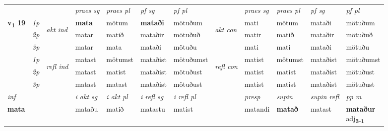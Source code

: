 \begin{longtable}[l]{X>{\footnotesize\itshape}llXXXXlXXXX}
\midrule

 & &   & \textit{praes sg}  & \textit{praes pl}    & \textit{ pf sg} & \textit{pf pl} & & \textit{praes sg}  & \textit{praes pl}    & \textit{pf sg} & \textit{pf pl }  \\ \cmidrule{4-7} \cmidrule{9-12}
 \multirow{2}{*}{{{\textbf{v{\textsubscript{1}}} \Large{\textbf{19}}}}}  & 1p & \multirow{3}{*}{\begin{turn}{90}\textit{akt ind}\end{turn}} & \textbf{mata} & mötum & \textbf{mataði} & mötuðum & \multirow{3}{*}{\begin{turn}{90}\textit{akt con}\end{turn}} &mati & mötum & mataði & mötuðum\\*
 & 2p &  &  matar  & matið & mataðir & mötuðuð & & matir & matið & mataðir & mötuðuð \\*
 & 3p &  & matar & mata & mataði & mötuðu & & mati & mati& mataði & mötuðu \\*
\cmidrule{4-7} \cmidrule{9-12}
 & 1p & \multirow{3}{*}{\begin{turn}{90}\textit{refl ind}\end{turn}}  & matast & mötumst & mataðist & mötuðumst & \multirow{3}{*}{\begin{turn}{90}\textit{refl con}\end{turn}}  &matist & mötumst & mataðist & mötuðumst \\*
 & 2p &  & matast & matist & mataðist & mötuðust & &matist & matist & mataðist & mötuðust \\*
 & 3p  & & matast & matast & mataðist & mötuðust & & matist & matist& mataðist & mötuðust \\*
\cmidrule{4-7} \cmidrule{9-12}

   {\textit{inf}} & &  & \textit{i akt sg} & \textit{i akt pl} & \textit{i refl sg} & \textit{i refl pl} && \textit{presp} & \textit{supin} & \textit{supin refl} & \textit{pp m} \\*
  {\textbf{mata}} & && mataðu  & matið & matastu & matist && matandi &  \textbf{matað} & matast & \specialcell{\textbf{mataður} \\ adj\textbf{\textsubscript{3-1}}} \\*

\midrule


\end{longtable}
